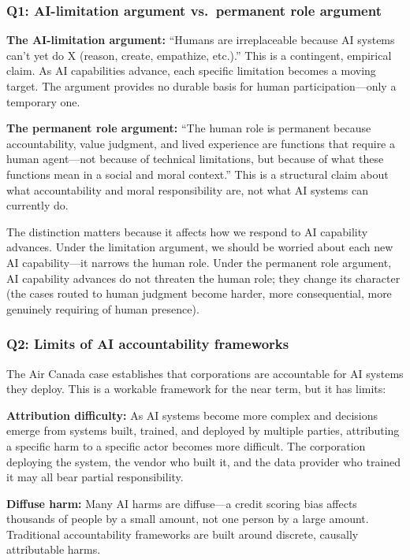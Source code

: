 \subsubsection*{Q1: AI-limitation argument vs.\ permanent role argument}

\textbf{The AI-limitation argument:} ``Humans are irreplaceable because AI systems can't yet do X (reason, create, empathize, etc.).'' This is a contingent, empirical claim. As AI capabilities advance, each specific limitation becomes a moving target. The argument provides no durable basis for human participation---only a temporary one.

\textbf{The permanent role argument:} ``The human role is permanent because accountability, value judgment, and lived experience are functions that require a human agent---not because of technical limitations, but because of what these functions mean in a social and moral context.'' This is a structural claim about what accountability and moral responsibility are, not what AI systems can currently do.

The distinction matters because it affects how we respond to AI capability advances. Under the limitation argument, we should be worried about each new AI capability---it narrows the human role. Under the permanent role argument, AI capability advances do not threaten the human role; they change its character (the cases routed to human judgment become harder, more consequential, more genuinely requiring of human presence).

\subsubsection*{Q2: Limits of AI accountability frameworks}

The Air Canada case establishes that corporations are accountable for AI systems they deploy. This is a workable framework for the near term, but it has limits:

\textbf{Attribution difficulty:} As AI systems become more complex and decisions emerge from systems built, trained, and deployed by multiple parties, attributing a specific harm to a specific actor becomes more difficult. The corporation deploying the system, the vendor who built it, and the data provider who trained it may all bear partial responsibility.

\textbf{Diffuse harm:} Many AI harms are diffuse---a credit scoring bias affects thousands of people by a small amount, not one person by a large amount. Traditional accountability frameworks are built around discrete, causally attributable harms.

